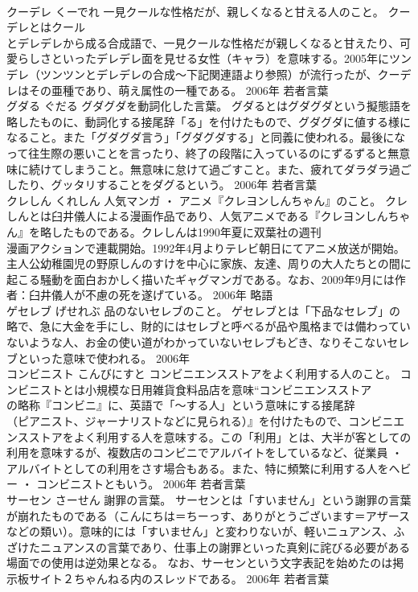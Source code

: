 \documentclass[8pt]{extreport}
\begin{document}
\begin{CJK}{UTF8}{min}
\\	クーデレ	くーでれ	一見クールな性格だが、親しくなると甘える人のこと。	クーデレとはクール
\\	とデレデレから成る合成語で、一見クールな性格だが親しくなると甘えたり、可愛らしさといったデレデレ面を見せる女性（キャラ）を意味する。2005年にツンデレ（ツンツンとデレデレの合成～下記関連語より参照）が流行ったが、クーデレはその亜種であり、萌え属性の一種である。	2006年	若者言葉	
\\	グダる	ぐだる	グダグダを動詞化した言葉。	グダるとはグダグダという擬態語を略したものに、動詞化する接尾辞「る」を付けたもので、グダグダに値する様になること。また「グダグダ言う」「グダグダする」と同義に使われる。最後になって往生際の悪いことを言ったり、終了の段階に入っているのにずるずると無意味に続けてしまうこと。無意味に怠けて過ごすこと。また、疲れてダラダラ過ごしたり、グッタリすることをダグるという。	2006年	若者言葉	
\\	クレしん	くれしん	人気マンガ ・ アニメ『クレヨンしんちゃん』のこと。	クレしんとは臼井儀人による漫画作品であり、人気アニメである『クレヨンしんちゃん』を略したものである。クレしんは1990年夏に双葉社の週刊
\\	漫画アクションで連載開始。1992年4月よりテレビ朝日にてアニメ放送が開始。主人公幼稚園児の野原しんのすけを中心に家族、友達、周りの大人たちとの間に起こる騒動を面白おかしく描いたギャグマンガである。なお、2009年9月には作者：臼井儀人が不慮の死を遂げている。	2006年	略語	
\\	ゲセレブ	げせれぶ	品のないセレブのこと。	ゲセレブとは「下品なセレブ」の略で、急に大金を手にし、財的にはセレブと呼べるが品や風格までは備わっていないような人、お金の使い道がわかっていないセレブもどき、なりそこないセレブといった意味で使われる。	2006年	
\\	コンビニスト	こんびにすと	コンビニエンスストアをよく利用する人のこと。	コンビニストとは小規模な日用雑貨食料品店を意味“コンビニエンスストア
\\	の略称『コンビニ』に、英語で「～する人」という意味にする接尾辞
\\	（ピアニスト、ジャーナリストなどに見られる）』を付けたもので、コンビニエンスストアをよく利用する人を意味する。この「利用」とは、大半が客としての利用を意味するが、複数店のコンビニでアルバイトをしているなど、従業員 ・ アルバイトとしての利用をさす場合もある。また、特に頻繁に利用する人をヘビー ・ コンビニストともいう。	2006年	若者言葉	
\\	サーセン	さーせん	謝罪の言葉。	サーセンとは「すいません」という謝罪の言葉が崩れたものである（こんにちは＝ちーっす、ありがとうございます＝アザースなどの類い）。意味的には「すいません」と変わりないが、軽いニュアンス、ふざけたニュアンスの言葉であり、仕事上の謝罪といった真剣に詫びる必要がある場面での使用は逆効果となる。 なお、サーセンという文字表記を始めたのは掲示板サイト２ちゃんねる内のスレッドである。	2006年	若者言葉	

\end{CJK}
\end{document}

